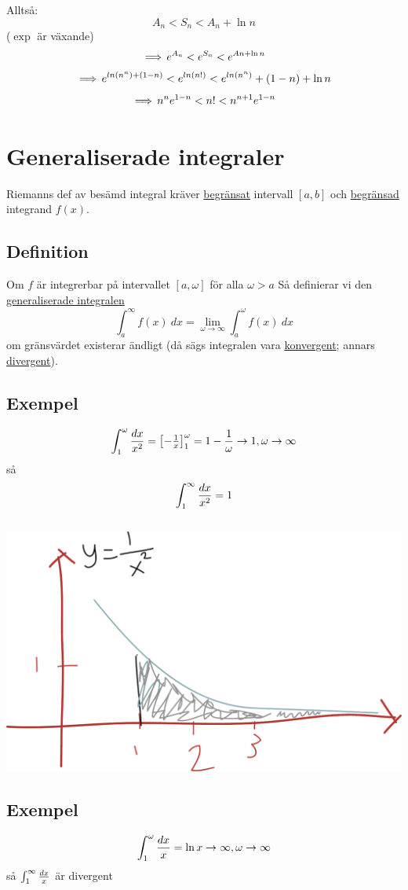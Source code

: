 \documentclass{article}
\begin{document}
Alltså:
$$ A_n < S_n < A_n + \ln n $$
($\exp$ är växande)
$$ \operatorname{\implies} e^{A_n} < e^{S_n} < e^{An+\ln n} $$
$$ \operatorname{\implies} e^{ln(n^n) + (1-n)} < e^{ln(n!)} < e^{ln(n^n)} + (1-n) + \ln n $$
$$ \operatorname{\implies} n^n e^{1-n} < n! < n^{n+1} e^{1-n} $$

\section{Generaliserade integraler}
Riemanns def av besämd integral kräver \uline{begränsat} intervall $[a,b]$ och \uline{begränsad} integrand $f(x)$.

\subsection{Definition}
Om $f$ är integrerbar på intervallet $[a,\omega]$ för alla $\omega>a$
Så definierar vi den \uline{generaliserade integralen}
$$ \int^\infty_a{f(x)\ dx}=\lim_{\omega\to\infty} \int^\omega_a{f(x)\ dx} $$
om gränsvärdet existerar ändligt (då sägs integralen vara \uline{konvergent}; annars \uline{divergent}).

\subsection{Exempel}
$$ \int^\omega_1{dx \over x^2} = \left[\begin{matrix}-\frac{1}{x}\end{matrix}\right]^\omega_1 = 1-\frac{1}{\omega} \to 1, \omega \to \infty $$
så
$$ \int^\infty_1{dx \over x^2} = 1 $$\\

\includegraphics[scale=0.25]{img/img10.pdf}

\subsection{Exempel}
$$ \int^\omega_1{dx \over x} = \ln x \to \infty, \omega \to \infty $$
så $ \int^\infty_1{dx \over x} $ är divergent\\
\end{document}
